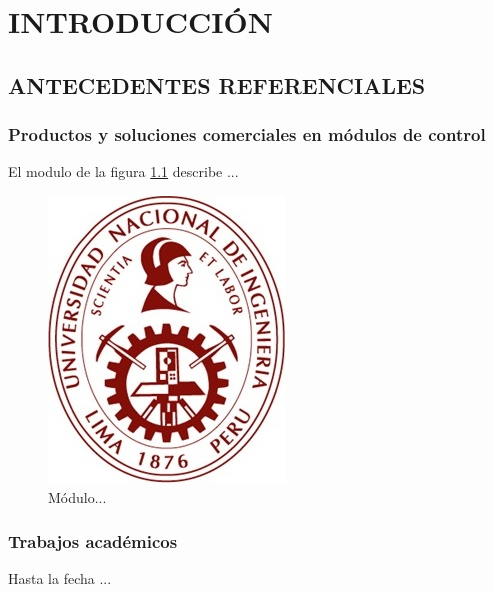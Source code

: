 \chapter{INTRODUCCIÓN}


\section{ANTECEDENTES REFERENCIALES}

\subsection{Productos y soluciones comerciales en módulos de control}
\begin{adjustwidth}{2.4em}{0em}
El modulo de la figura \ref{fig:logox} describe ...
\begin{figure}[H]
	\singlespacing
	\centering
	\includegraphics[width=0.2\linewidth]{logo}
	\caption[Módulo ...]{Módulo...}
	\label{fig:logox}
\end{figure}

\end{adjustwidth}

\subsection{Trabajos académicos}
\begin{adjustwidth}{2.4em}{0em}
Hasta la fecha ...
\end{adjustwidth}

